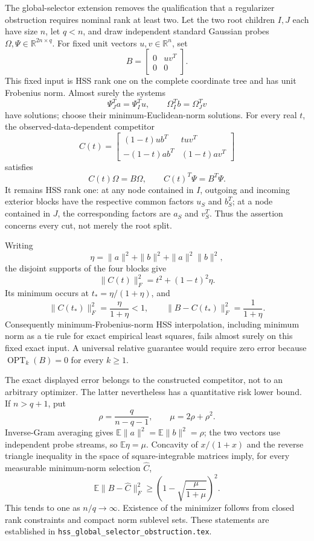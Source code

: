 \documentclass[11pt,oneside,openany,a4paper]{report}
\numberwithin{equation}{chapter}
\theoremstyle{definition}
\theoremstyle{remark}
\newcommand{\sourcefile}[1]{{\small\nolinkurl{#1}}}
\begin{document}
The global-selector extension removes the qualification that a
regularizer obstruction requires nominal rank at least two.  Let the
two root children $I,J$ each have size $n$, let $q<n$, and draw
independent standard Gaussian probes $\Omega,\Psi\in\mathbb R^{2n\times q}$.
For fixed unit vectors $u,v\in\mathbb R^n$, set
\[
 B=\begin{bmatrix}0&uv^T\\0&0\end{bmatrix}.
\]
This fixed input is HSS rank one on the complete coordinate tree and has
unit Frobenius norm.  Almost surely the systems
\[
 \Psi_J^Ta=\Psi_I^Tu,\qquad
 \Omega_I^Tb=\Omega_J^Tv
\]
have solutions; choose their minimum-Euclidean-norm solutions.  For every
real $t$, the observed-data-dependent competitor
\[
 C(t)=\begin{bmatrix}
 (1-t)ub^T&tuv^T\\
 -(1-t)ab^T&(1-t)av^T
 \end{bmatrix}
\]
satisfies
\[
 C(t)\Omega=B\Omega,\qquad C(t)^T\Psi=B^T\Psi.
\]
It remains HSS rank one: at any node contained in $I$, outgoing and
incoming exterior blocks have the respective common factors $u_S$ and
$b_S^T$; at a node contained in $J$, the corresponding factors are $a_S$
and $v_S^T$.  Thus the assertion concerns every cut, not merely the root
split.

Writing
\[
 \eta=\|a\|^2+\|b\|^2+\|a\|^2\|b\|^2,
\]
the disjoint supports of the four blocks give
\[
 \|C(t)\|_F^2=t^2+(1-t)^2\eta.
\]
Its minimum occurs at $t_*={\eta}/({1+\eta})$, and
\[
 \|C(t_*)\|_F^2=\frac{\eta}{1+\eta}<1,
 \qquad
 \|B-C(t_*)\|_F^2=\frac1{1+\eta}.
\]
Consequently minimum-Frobenius-norm HSS interpolation, including minimum
norm as a tie rule for exact empirical least squares, fails almost
surely on this fixed exact input.  A universal relative guarantee would
require zero error because $\operatorname{OPT}_k(B)=0$ for every $k\ge1$.

The exact displayed error belongs to the constructed competitor, not
to an arbitrary optimizer.  The latter nevertheless has a quantitative
risk lower bound.  If $n>q+1$, put
\[
 \rho=\frac{q}{n-q-1},\qquad \mu=2\rho+\rho^2.
\]
Inverse-Gram averaging gives $\mathbb E\|a\|^2=
\mathbb E\|b\|^2=\rho$; the two vectors use independent probe streams,
so $\mathbb E\eta=\mu$.  Concavity of $x/(1+x)$ and the reverse triangle
inequality in the space of square-integrable matrices imply, for every
measurable minimum-norm selection $\widehat C$,
\[
 \mathbb E\|B-\widehat C\|_F^2
 \ge\left(1-\sqrt{\frac{\mu}{1+\mu}}\right)^2.
\]
This tends to one as $n/q\to\infty$.  Existence of the minimizer follows
from closed rank constraints and compact norm sublevel sets.  These
statements are established in \sourcefile{hss_global_selector_obstruction.tex}.
\end{document}
